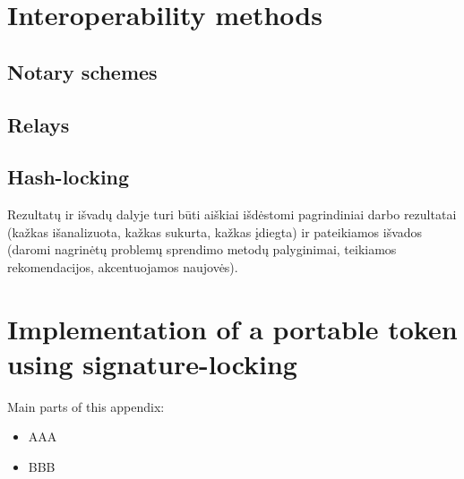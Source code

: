 \documentclass{VUMIFPSkursinis}
\title{\titlecap{Tema in title case english}}
\author{Vardenis Pavardenis}
\date{Vilnius – \the\year}
\begin{document}
	
\maketitle
\cleardoublepage{}
\setcounter{page}{2}

\tableofcontents


\section{Interoperability methods}
\subsection{Notary schemes}

\subsection{Relays}

\subsection{Hash-locking}

Rezultatų ir išvadų dalyje turi būti aiškiai išdėstomi pagrindiniai darbo
rezultatai (kažkas išanalizuota, kažkas sukurta, kažkas įdiegta) ir pateikiamos
išvados (daromi nagrinėtų problemų sprendimo metodų palyginimai, teikiamos
rekomendacijos, akcentuojamos naujovės).


\printbibliography[heading=bibintoc, title=References]  %


\appendix  %

\section{Implementation of a portable token using signature-locking}
Main parts of this appendix:
\begin{itemize}
  \item AAA
  \item BBB
\end{itemize}
\end{document}
